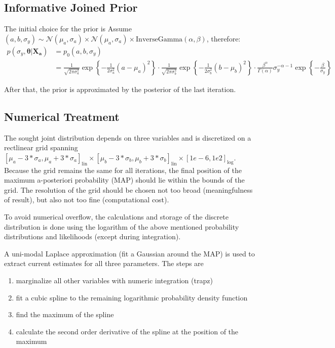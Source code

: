 \documentclass[10pt]{article}
\renewcommand{\vec}[1]{\boldsymbol{#1}}
\begin{document}
\subsection{Informative Joined Prior}
The initial choice for the prior is
\label{sec:initial_informative_prior}
Assume $(a,b,\sigma_y) \sim \mathcal{N}(\mu_a, \sigma_a) \times \mathcal{N}(\mu_a, \sigma_a) \times \text{InverseGamma}(\alpha, \beta) $, therefore:
\begin{align}
    p(\sigma_y, \vec{\theta} | \vec{X_a}) &= p_0(a, b, \sigma_y) \\
    &= 
    \frac{1}{\sqrt{2 \pi \sigma_{a}^2}} \exp\left\{ - \frac{1}{2\sigma_{a}^2} ( a - \mu_{a} )^2 \right\} \cdot 
    \frac{1}{\sqrt{2 \pi \sigma_{b}^2}} \exp\left\{ - \frac{1}{2\sigma_{b}^2} ( b - \mu_{b} )^2 \right\} \cdot
    \frac{\beta^{\alpha}}{\Gamma(\alpha)} \sigma_y^{-\alpha-1} \exp\left\{ - \frac{\beta}{\sigma_y} \right\} 
\end{align}

After that, the prior is approximated by the posterior of the last iteration.

\subsection{Numerical Treatment}
The sought joint distribution depends on three variables and is discretized on a rectlinear grid spanning 
$
    [\mu_a - 3 * \sigma_a, \mu_a + 3 * \sigma_a]_{\text{lin}} \times 
    [\mu_b - 3 * \sigma_b, \mu_b + 3 * \sigma_b]_{\text{lin}} \times 
    [1e-6, 1e2]_{\text{log}}
$. 
Because the grid remains the same for all iterations, the final position of the maximum a-posteriori probability (MAP) should lie within the bounds of the grid.
The resolution of the grid should be chosen not too broad (meaningfulness of result), but also not too fine (computational cost).

To avoid numerical overflow, the calculations and storage of the discrete distribution is done using the logarithm of the above mentioned probability distributions and likelihoods (except during integration).

A uni-modal Laplace approximation (fit a Gaussian around the MAP) is used to extract current estimates for all three parameters. 
The steps are
\begin{enumerate}
    \item marginalize all other variables with numeric integration (trapz)
    \item fit a cubic spline to the remaining logarithmic probability density function
    \item find the maximum of the spline
    \item calculate the second order derivative of the spline at the position of the maximum
\end{enumerate}
\end{document}
